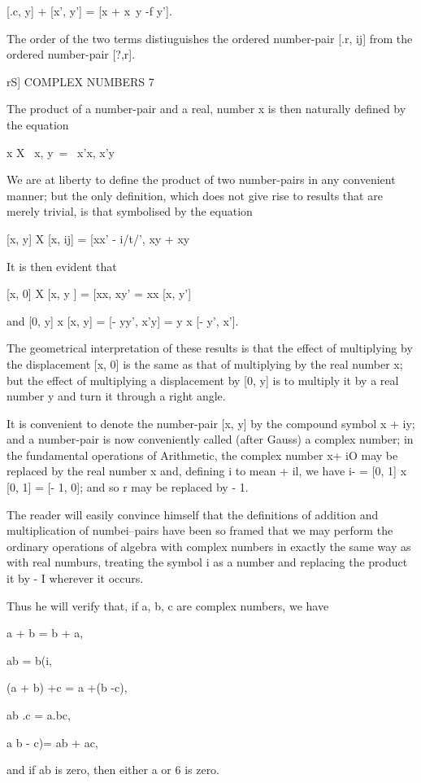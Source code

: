 [.c, y] + [x', y'] = [x + x\ y -f y'].

The order of the two terms distiuguishes the ordered number-pair [.r,
ij] from the ordered number-pair [?,r].

rS] COMPLEX NUMBERS 7

The product of a number-pair and a real, number x is then naturally
defined by the equation

x X \ x, y\ = \ x'x, x'y\

We are at liberty to define the product of two number-pairs in any
convenient manner; but the only definition, which does not give rise
to results that are merely trivial, is that symbolised by the equation

[x, y] X [x, ij] = [xx' - i/t/', xy + xy\

It is then evident that

[x, 0] X [x, y ] = [xx, xy' = xx [x, y']

and [0, y] x [x, y] = [- yy', x'y] = y x [- y', x'].

The geometrical interpretation of these results is that the effect of
multiplying by the displacement [x, 0] is the same as that of
multiplying by the real number x; but the effect of multiplying a
displacement by [0, y] is to multiply it by a real number y and turn
it through a right angle.

It is convenient to denote the number-pair [x, y] by the compound
symbol x + iy; and a number-pair is now conveniently called (after
Gauss) a complex number; in the fundamental operations of Arithmetic,
the complex number x+ iO may be replaced by the real number x and,
defining i to mean + il, we have i- = [0, 1] x [0, 1] = [- 1, 0]; and
so r may be replaced by - 1.

The reader will easily convince himself that the definitions of
addition and multiplication of numbei--pairs have been so framed that
we may perform the ordinary operations of algebra with complex numbers
in exactly the same way as with real numburs, treating the symbol i as
a number and replacing the product it by - I wherever it occurs.

Thus he will verify that, if a, b, c are complex numbers, we have

a + b = b + a,

ab = b(i,

(a + b) +c = a +(b -\-c),

ab .c = a.bc,

a b -\- c)= ab + ac,

and if ab is zero, then either a or 6 is zero.


